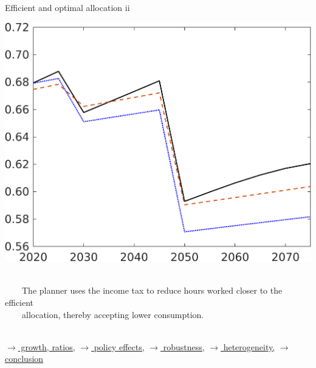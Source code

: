 \documentclass[11pt,aspectratio=169]{beamer}
\newcommand{\ar}{$\Rightarrow$ \ }
\begin{document}
\begin{frame}{Efficient and optimal allocation ii }
\begin{minipage}[]{0.3\textwidth}
\end{minipage}
	\begin{minipage}[]{0.3\textwidth}
	\includegraphics[width=1\textwidth]{../codding_model/own_basedOnFried/optimalPol_elastS_DisuSci/figures/all_1705/C_CompEffOPT_T_NoTaus_spillover0_noskill0_sep1_BN0_ineq0_red0_xgrowth0_zero0_countec0_etaa0.79_lgd0.png}
\end{minipage}

\vspace{6mm}
\begin{block}{}
	\ \\ 	\ \ \ \ 
	 The planner uses the income tax to reduce hours worked closer to the efficient \\ \ \ \ \  allocation, thereby accepting lower consumption.  \\ \ 
\end{block}

%	
	\vspace{-3mm}
\hfill
\hyperlink{effalloOthers}{\tiny{$\rightarrow$ growth, ratios,}}
\hyperlink{disen}{\tiny{$\rightarrow$ policy effects,}}
\hyperlink{robustness}{\tiny{$\rightarrow$ robustness,}}
\hyperlink{heterogeneity}{\tiny{$\rightarrow$ heterogeneity,}}
\hyperlink{conc}{\tiny{$\rightarrow$ conclusion}}
 

\end{frame}
\end{document}
